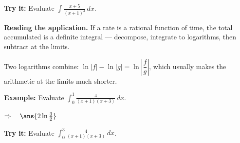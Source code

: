 \documentclass[12pt]{article}
\begin{document}
\begin{tryitbox}
\textbf{Try it:} \quad Evaluate $\displaystyle\int \frac{x + 5}{(x + 1)^2}\,dx$.\\[2pt]
\end{tryitbox}


\begin{formulabox}
\textbf{Reading the application.} If a rate is a rational function of time, the
total accumulated is a definite integral --- decompose, integrate to logarithms,
then subtract at the limits.\par
Two logarithms combine: $\ln|f| - \ln|g| = \ln\left|\dfrac{f}{g}\right|$, which
usually makes the arithmetic at the limits much shorter.
\end{formulabox}

\begin{examplebox}
\textbf{Example:} \quad Evaluate $\displaystyle\int_0^1 \frac{4}{(x + 1)(x + 3)}\,dx$.

$\Rightarrow\quad \ans{2\ln\frac{3}{2}}$
\end{examplebox}

\begin{tryitbox}
\textbf{Try it:} \quad Evaluate $\displaystyle\int_0^3 \frac{4}{(x + 1)(x + 3)}\,dx$.\\[2pt]
\end{tryitbox}
\end{document}
